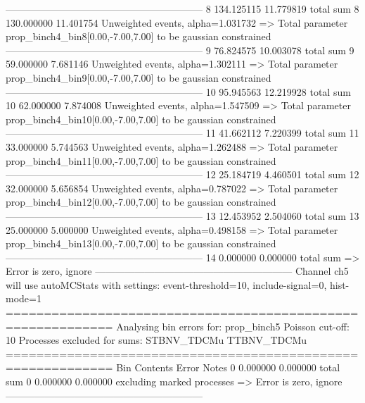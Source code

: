 ------------------------------------------------------------
8          134.125115      11.779819       total sum                     
8          130.000000      11.401754       Unweighted events, alpha=1.031732
  => Total parameter prop_binch4_bin8[0.00,-7.00,7.00] to be gaussian constrained
------------------------------------------------------------
9          76.824575       10.003078       total sum                     
9          59.000000       7.681146        Unweighted events, alpha=1.302111
  => Total parameter prop_binch4_bin9[0.00,-7.00,7.00] to be gaussian constrained
------------------------------------------------------------
10         95.945563       12.219928       total sum                     
10         62.000000       7.874008        Unweighted events, alpha=1.547509
  => Total parameter prop_binch4_bin10[0.00,-7.00,7.00] to be gaussian constrained
------------------------------------------------------------
11         41.662112       7.220399        total sum                     
11         33.000000       5.744563        Unweighted events, alpha=1.262488
  => Total parameter prop_binch4_bin11[0.00,-7.00,7.00] to be gaussian constrained
------------------------------------------------------------
12         25.184719       4.460501        total sum                     
12         32.000000       5.656854        Unweighted events, alpha=0.787022
  => Total parameter prop_binch4_bin12[0.00,-7.00,7.00] to be gaussian constrained
------------------------------------------------------------
13         12.453952       2.504060        total sum                     
13         25.000000       5.000000        Unweighted events, alpha=0.498158
  => Total parameter prop_binch4_bin13[0.00,-7.00,7.00] to be gaussian constrained
------------------------------------------------------------
14         0.000000        0.000000        total sum                     
  => Error is zero, ignore      
------------------------------------------------------------
Channel ch5 will use autoMCStats with settings: event-threshold=10, include-signal=0, hist-mode=1
============================================================
Analysing bin errors for: prop_binch5
Poisson cut-off: 10
Processes excluded for sums: STBNV_TDCMu TTBNV_TDCMu
============================================================
Bin        Contents        Error           Notes                         
0          0.000000        0.000000        total sum                     
0          0.000000        0.000000        excluding marked processes    
  => Error is zero, ignore      
------------------------------------------------------------
